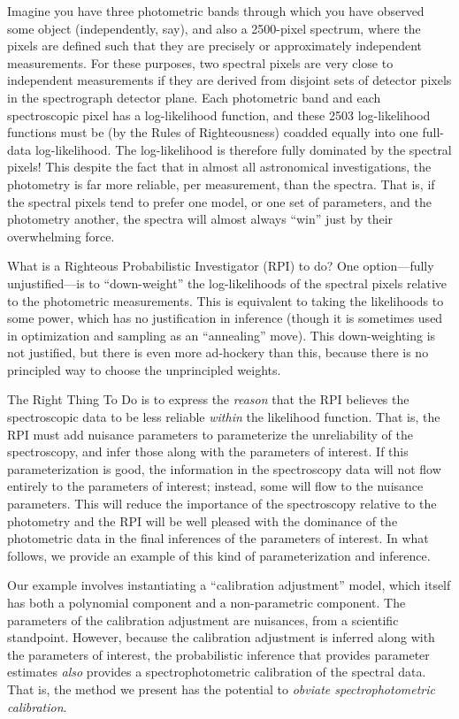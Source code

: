 \documentclass[12pt, letterpaper, preprint]{aastex}
\begin{document}
Imagine you have three photometric bands through which you have
observed some object (independently, say), and also a 2500-pixel
spectrum, where the pixels are defined such that they are precisely or
approximately independent measurements.
For these purposes, two spectral pixels are very close to independent
measurements if they are derived from disjoint sets of detector pixels
in the spectrograph detector plane.
Each photometric band and each spectroscopic pixel has a
log-likelihood function, and these 2503 log-likelihood functions must
be (by the Rules of Righteousness) coadded equally into one full-data
log-likelihood.
The log-likelihood is therefore fully dominated by the spectral
pixels!
This despite the fact that in almost all astronomical investigations,
the photometry is far more reliable, per measurement, than the
spectra.
That is, if the spectral pixels tend to prefer one model, or one set
of parameters, and the photometry another, the spectra will almost
always ``win'' just by their overwhelming force.

What is a Righteous Probabilistic Investigator (RPI) to do?
One option---fully unjustified---is to ``down-weight'' the
log-likelihoods of the spectral pixels relative to the photometric
measurements.
This is equivalent to taking the likelihoods to some power, which has
no justification in inference (though it is sometimes used in
optimization and sampling as an ``annealing'' move).
This down-weighting is not justified, but there is even more
ad-hockery than this, because there is no principled way to choose the
unprincipled weights.

The Right Thing To Do is to express the \emph{reason} that the RPI
believes the spectroscopic data to be less reliable \emph{within} the
likelihood function.
That is, the RPI must add nuisance parameters to parameterize the
unreliability of the spectroscopy, and infer those along with the
parameters of interest.
If this parameterization is good, the information in the spectroscopy
data will not flow entirely to the parameters of interest; instead,
some will flow to the nuisance parameters.
This will reduce the importance of the spectroscopy relative to the
photometry and the RPI will be well pleased with the dominance of the
photometric data in the final inferences of the parameters of
interest.
In what follows, we provide an example of this kind of
parameterization and inference.

Our example involves instantiating a ``calibration adjustment'' model,
which itself has both a polynomial component and a non-parametric
component.
The parameters of the calibration adjustment are nuisances, from a
scientific standpoint.
However, because the calibration adjustment is inferred along with the
parameters of interest, the probabilistic inference that provides
parameter estimates \emph{also} provides a spectrophotometric
calibration of the spectral data.
That is, the method we present has the potential to \emph{obviate
spectrophotometric calibration}.
\end{document}
